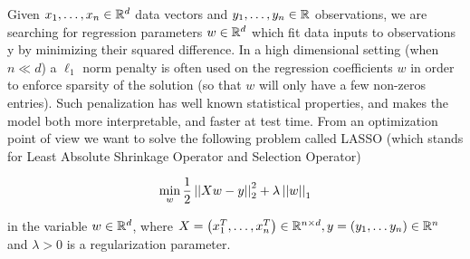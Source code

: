 \documentclass[a4paper, 11pt]{report}
\begin{document}

\maketitle

Given $x_1, \dots, x_n \in \mathbb{R}^{d}$ data vectors and $y_1, \dots, y_n \in \mathbb{R}$ observations, we are searching
for regression parameters $w \in \mathbb{R}^{d}$ which fit data inputs to observations y by minimizing their squared difference. In a high dimensional setting (when $n \ll d$) a $\ell_1$ norm penalty is often used on the regression coefficients $w$ in order to enforce sparsity of the solution (so that $w$ will only have a few non-zeros entries). Such penalization has well known statistical properties, and makes the model both more interpretable, and faster at test time. From an optimization point of view we want to solve the following problem called LASSO (which stands for Least Absolute Shrinkage Operator and Selection Operator)

\begin{equation*}
    \begin{aligned}
    \min_{w} \frac{1}{2} \left|\left| Xw - y \right|\right|_{2}^{2} + \lambda \left|\left| w \right|\right|_{1}
    \end{aligned}
\end{equation*}

in the variable $w \in \mathbb{R}^{d}$, where $X = \left( x_1^T, \dots, x_n^T \right) \in \mathbb{R}^{n \times d}, y = \left( y_1, \dots y_n \right) \in \mathbb{R}^{n}$ and $\lambda > 0$ is a regularization parameter.
\end{document}
